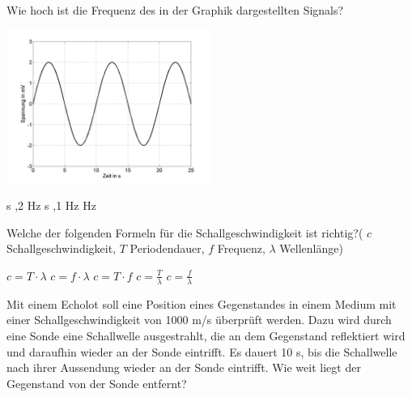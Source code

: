 \documentclass[11pt]{exam}
\begin{document}
\setlength{\voffset}{-0.5in}
\setlength{\headsep}{5pt}

\hspace{2mm}
 \hspace{5mm}
\vspace{4mm}

\begin{questions}

\question Wie hoch ist die Frequenz des in der Graphik dargestellten Signals? 

\includegraphics[width=0.5\textwidth]{../../../questions/J/images/SchallSinus1.png}

\begin{choices}
	 s
	,2 Hz
	 s
	,1 Hz
	 Hz
\end{choices}

\vspace{3mm}\question Welche der folgenden Formeln für die Schallgeschwindigkeit ist richtig?( \( c \) Schallgeschwindigkeit, \(T \) Periodendauer, \( f \) Frequenz, \( \lambda \) Wellenlänge)

\begin{choices}
	\choice \( c=T \cdot \lambda \)
	\choice \( c=f \cdot \lambda \)
	\choice \( c=T \cdot f \)
	\choice \( c=\frac{T}{\lambda} \)
	\choice \( c=\frac{f}{\lambda} \)
\end{choices}

\vspace{3mm}\question Mit einem Echolot soll eine Position eines Gegenstandes in einem Medium mit einer Schallgeschwindigkeit von 1000 m/s überprüft werden. Dazu wird durch eine Sonde eine Schallwelle ausgestrahlt, die an dem Gegenstand reflektiert wird und daraufhin wieder an der Sonde eintrifft. Es dauert 10 s, bis die Schallwelle nach ihrer Aussendung wieder an der Sonde eintrifft. Wie weit liegt der Gegenstand von der Sonde entfernt?


\end{questions}
\end{document}
